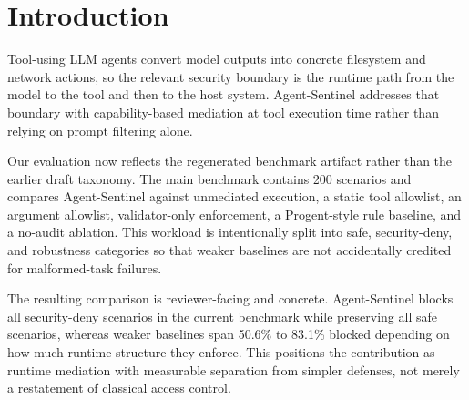\section{Introduction}

Tool-using LLM agents convert model outputs into concrete filesystem and network actions, so the relevant security boundary is the runtime path from the model to the tool and then to the host system. Agent-Sentinel addresses that boundary with capability-based mediation at tool execution time rather than relying on prompt filtering alone.

Our evaluation now reflects the regenerated benchmark artifact rather than the earlier draft taxonomy. The main benchmark contains 200 scenarios and compares Agent-Sentinel against unmediated execution, a static tool allowlist, an argument allowlist, validator-only enforcement, a Progent-style rule baseline, and a no-audit ablation. This workload is intentionally split into safe, security-deny, and robustness categories so that weaker baselines are not accidentally credited for malformed-task failures.

The resulting comparison is reviewer-facing and concrete. Agent-Sentinel blocks all security-deny scenarios in the current benchmark while preserving all safe scenarios, whereas weaker baselines span 50.6\% to 83.1\% blocked depending on how much runtime structure they enforce. This positions the contribution as runtime mediation with measurable separation from simpler defenses, not merely a restatement of classical access control.
